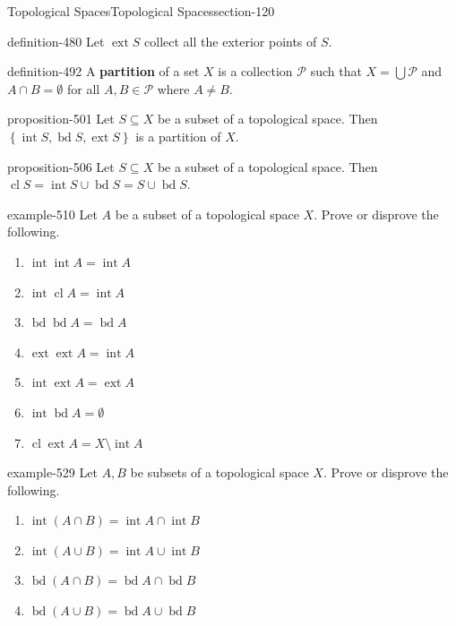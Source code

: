 \documentclass[oneside,10pt,]{article}
\newcommand{\terminology}[1]{\textbf{#1}}
\newcommand{\mc}{\mathcal}
\newcommand{\cl}{\operatorname{cl}}
\renewcommand{\int}{\operatorname{int}}
\newcommand{\ext}{\operatorname{ext}}
\newcommand{\bd}{\operatorname{bd}}
\newcommand{\setList}[1]{\left\{#1\right\}}
\begin{document}
\begin{sectionptx}{Topological Spaces}{}{Topological Spaces}{}{}{section-120}
\begin{definition}{}{definition-480}
Let \(\ext S\) collect all the exterior points of \(S\).%
\end{definition}
\begin{definition}{}{definition-492}%
\hypertarget{p-493}{}%
A \terminology{partition} of a set \(X\) is a collection \(\mc P\) such that \(X=\bigcup\mc P\) and \(A\cap B=\emptyset\) for all \(A,B\in\mc P\) where \(A\not=B\).%
\end{definition}
\begin{proposition}{}{}{proposition-501}%
\hypertarget{p-502}{}%
Let \(S\subseteq X\) be a subset of a topological space. Then \(\setList{\int S,\bd S,\ext S}\) is a partition of \(X\).%
\end{proposition}
\begin{proposition}{}{}{proposition-506}%
\hypertarget{p-507}{}%
Let \(S\subseteq X\) be a subset of a topological space. Then \(\cl S=\int S\cup\bd S=S\cup\bd S\).%
\end{proposition}
\begin{example}{}{example-510}%
\hypertarget{p-511}{}%
Let \(A\) be a subset of a topological space \(X\). Prove or disprove the following.%
\leavevmode%
\begin{enumerate}
\item\hypertarget{li-515}{}\(\int\int A=\int A\)%
\item\hypertarget{li-517}{}\(\int\cl A=\int A\)%
\item\hypertarget{li-519}{}\(\bd\bd A=\bd A\)%
\item\hypertarget{li-521}{}\(\ext\ext A=\int A\)%
\item\hypertarget{li-523}{}\(\int\ext A=\ext A\)%
\item\hypertarget{li-525}{}\(\int\bd A=\emptyset\)%
\item\hypertarget{li-527}{}\(\cl\ext A=X\setminus\int A\)%
\end{enumerate}
\end{example}
\begin{example}{}{example-529}%
\hypertarget{p-530}{}%
Let \(A,B\) be subsets of a topological space \(X\). Prove or disprove the following.%
\leavevmode%
\begin{enumerate}
\item\hypertarget{li-534}{}\(\int(A\cap B)=\int A\cap\int B\)%
\item\hypertarget{li-536}{}\(\int(A\cup B)=\int A\cup\int B\)%
\item\hypertarget{li-538}{}\(\bd(A\cap B)=\bd A\cap\bd B\)%
\item\hypertarget{li-540}{}\(\bd(A\cup B)=\bd A\cup\bd B\)%

\end{enumerate}
\end{example}
\end{sectionptx}
\end{document}

